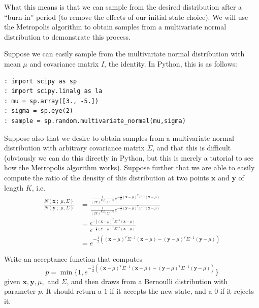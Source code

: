 What this means is that we can sample from the desired distribution after a ``burn-in'' period (to remove the effects of our initial state choice). We will use the Metropolis algorithm to obtain samples from a multivariate normal distribution to demonstrate this process.

Suppose we can easily sample from the multivariate normal distribution with mean $\mu$ and covariance matrix $I$, the identity. In Python, this is as follows:
\begin{lstlisting}[style=python]
: import scipy as sp
: import scipy.linalg as la
: mu = sp.array([3., -5.])
: sigma = sp.eye(2)
: sample = sp.random.multivariate_normal(mu,sigma)
\end{lstlisting}

Suppose also that we desire to obtain samples from a multivariate normal distribution with arbitrary covariance matrix $\Sigma$, and that this is difficult (obviously we can do this directly in Python, but this is merely a tutorial to see how the Metropolis algorithm works). Suppose further that we are able to easily compute the ratio of the density of this distribution at two points $\mathbf{x}$ and $\mathbf{y}$ of length $K$, i.e.
\begin{align*}
\frac{N(\mathbf{x} \; ; \; \mu, \Sigma)}{N(\mathbf{y} \; ; \; \mu, \Sigma)} & = \frac{\frac{1}{(2\pi)^{K/2}|\Sigma|^{1/2}} e^{-\frac{1}{2}(\mathbf{x} - \mu)^{T} \Sigma^{-1} (\mathbf{x} - \mu)}}{\frac{1}{(2\pi)^{K/2}|\Sigma|^{1/2}} e^{-\frac{1}{2}(\mathbf{y} - \mu)^{T} \Sigma^{-1} (\mathbf{x} - \mu)}} \\
& = \frac{e^{-\frac{1}{2}(\mathbf{x} - \mu)^{T} \Sigma^{-1} (\mathbf{x} - \mu)}}{e^{-\frac{1}{2}(\mathbf{y} - \mu)^{T} \Sigma^{-1} (\mathbf{x} - \mu)}} \\
& = e^{-\frac{1}{2}\left((\mathbf{x} - \mu)^{T} \Sigma^{-1} (\mathbf{x} - \mu) - (\mathbf{y} - \mu)^{T} \Sigma^{-1} (\mathbf{y} - \mu)\right)}
\end{align*}

\begin{problem} \label{problem1}
Write an acceptance function that computes $$p = \min \{1, e^{-\frac{1}{2}\left((\mathbf{x} - \mu)^{T} \Sigma^{-1} (\mathbf{x} - \mu) - (\mathbf{y} - \mu)^{T} \Sigma^{-1} (\mathbf{y} - \mu)\right)}\}$$ given $\mathbf{x}, \mathbf{y}, \mu,$ and $\Sigma$, and then draws from a Bernoulli distribution with parameter $p$. It should return a $1$ if it accepts the new state, and a $0$ if it rejects it.
\end{problem}

